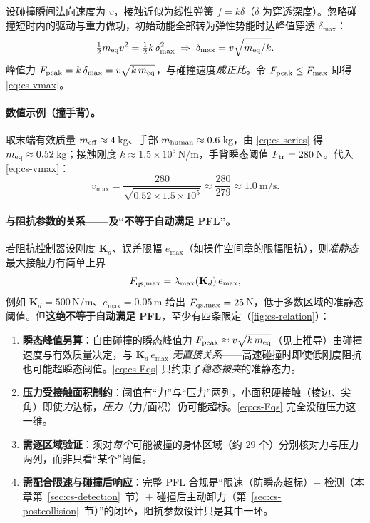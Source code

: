 \begin{derivation}
设碰撞瞬间法向速度为 $v$，接触近似为线性弹簧 $f=k\delta$（$\delta$ 为穿透深度）。忽略碰撞短时内的驱动与重力做功，初始动能全部转为弹性势能时达峰值穿透 $\delta_{\max}$：
\[
  \tfrac12 m_{\rm eq}v^2=\tfrac12 k\,\delta_{\max}^2
  \;\Rightarrow\; \delta_{\max}=v\sqrt{m_{\rm eq}/k}.
\]
峰值力 $F_{\rm peak}=k\,\delta_{\max}=v\sqrt{k\,m_{\rm eq}}$，与碰撞速度\emph{成正比}。令 $F_{\rm peak}\le F_{\max}$ 即得 \cref{eq:cs-vmax}。
\end{derivation}

\paragraph{数值示例（撞手背）。}
取末端有效质量 $m_{\rm eff}\approx 4$\,kg、手部 $m_{\rm human}\approx 0.6$\,kg，由 \cref{eq:cs-series} 得 $m_{\rm eq}\approx 0.52$\,kg；接触刚度 $k\approx 1.5\times10^{5}$\,N/m，手背瞬态阈值 $F_{\rm tr}=280$\,N。代入 \cref{eq:cs-vmax}：
\begin{equation}
  v_{\max}=\frac{280}{\sqrt{0.52\times 1.5\times10^{5}}}\approx\frac{280}{279}\approx 1.0\ \text{m/s}.
  \label{eq:cs-vmax-num}
\end{equation}

\paragraph{与阻抗参数的关系——及“不等于自动满足 PFL”。}
若阻抗控制器设刚度 $\mathbf K_d$、误差限幅 $e_{\max}$（如操作空间章的限幅阻抗），则\emph{准静态}最大接触力有简单上界
\begin{equation}
  F_{\rm qs,max}=\lambda_{\max}(\mathbf K_d)\,e_{\max},
  \label{eq:cs-Fqs}
\end{equation}
例如 $\mathbf K_d=500$\,N/m、$e_{\max}=0.05$\,m 给出 $F_{\rm qs,max}=25$\,N，低于多数区域的准静态阈值。但\textbf{这绝不等于自动满足 PFL}，至少有四条限定（\cref{fig:cs-relation}）：
\begin{enumerate}
  \item \textbf{瞬态峰值另算}：自由碰撞的瞬态峰值力 $F_{\rm peak}\approx v\sqrt{k\,m_{\rm eq}}$（见上推导）由碰撞速度与有效质量决定，与 $\mathbf K_d\,e_{\max}$ \emph{无直接关系}——高速碰撞时即使低刚度阻抗也可能超瞬态阈值。\cref{eq:cs-Fqs} 只约束了\emph{稳态被夹}的准静态力。
  \item \textbf{压力受接触面积制约}：阈值有“力”与“压力”两列，小面积硬接触（棱边、尖角）即使\emph{力}达标，\emph{压力}（力/面积）仍可能超标。\cref{eq:cs-Fqs} 完全没碰压力这一维。
  \item \textbf{需逐区域验证}：须对\emph{每个}可能被撞的身体区域（约 $29$ 个）分别核对力与压力两列，而非只看“某个”阈值。
  \item \textbf{需配合限速与碰撞后响应}：完整 PFL 合规是“限速（防瞬态超标）$+$ 检测（本章第~\ref{sec:cs-detection}~节）$+$ 碰撞后主动卸力（第~\ref{sec:cs-postcollision}~节）”的闭环，阻抗参数设计只是其中一环。
\end{enumerate}


